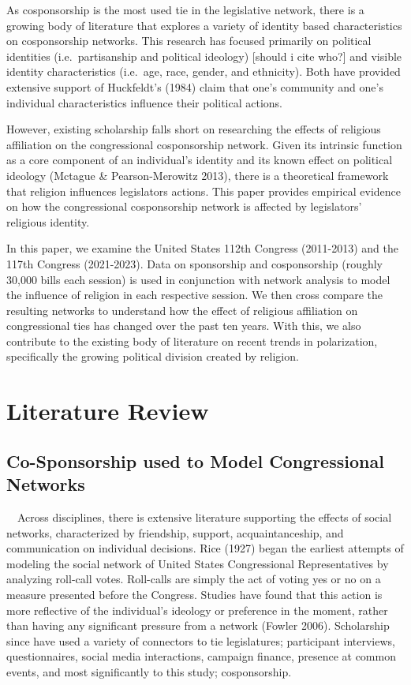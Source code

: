 \documentclass[Royal,times,sageh]{sagej}
\begin{document}
As cosponsorship is the most used tie in the legislative network, there
is a growing body of literature that explores a variety of identity
based characteristics on cosponsorship networks. This research has
focused primarily on political identities (i.e.~partisanship and
political ideology) {[}should i cite who?{]} and visible identity
characteristics (i.e.~age, race, gender, and ethnicity). Both have
provided extensive support of Huckfeldt's (1984) claim that one's
community and one's individual characteristics influence their political
actions.

However, existing scholarship falls short on researching the effects of
religious affiliation on the congressional cosponsorship network. Given
its intrinsic function as a core component of an individual's identity
and its known effect on political ideology (Mctague \& Pearson-Merowitz
2013), there is a theoretical framework that religion influences
legislators actions. This paper provides empirical evidence on how the
congressional cosponsorship network is affected by legislators'
religious identity.

In this paper, we examine the United States 112th Congress (2011-2013)
and the 117th Congress (2021-2023). Data on sponsorship and
cosponsorship (roughly 30,000 bills each session) is used in conjunction
with network analysis to model the influence of religion in each
respective session. We then cross compare the resulting networks to
understand how the effect of religious affiliation on congressional ties
has changed over the past ten years. With this, we also contribute to
the existing body of literature on recent trends in polarization,
specifically the growing political division created by religion.

\hypertarget{literature-review}{%
\section{Literature Review}\label{literature-review}}

\hypertarget{co-sponsorship-used-to-model-congressional-networks}{%
\subsection{Co-Sponsorship used to Model Congressional
Networks}\label{co-sponsorship-used-to-model-congressional-networks}}

~~Across disciplines, there is extensive literature supporting the
effects of social networks, characterized by friendship, support,
acquaintanceship, and communication on individual decisions. Rice (1927)
began the earliest attempts of modeling the social network of United
States Congressional Representatives by analyzing roll-call votes.
Roll-calls are simply the act of voting yes or no on a measure presented
before the Congress. Studies have found that this action is more
reflective of the individual's ideology or preference in the moment,
rather than having any significant pressure from a network (Fowler
2006). Scholarship since have used a variety of connectors to tie
legislatures; participant interviews, questionnaires, social media
interactions, campaign finance, presence at common events, and most
significantly to this study; cosponsorship.
\end{document}
